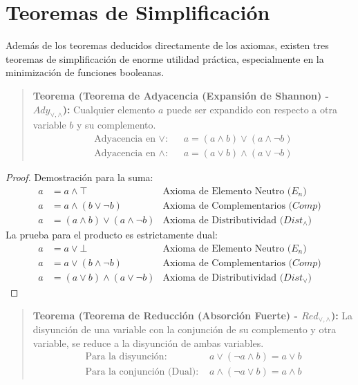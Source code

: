 \section{Teoremas de Simplificación}

Además de los teoremas deducidos directamente de los axiomas, existen tres teoremas de simplificación de enorme utilidad práctica, especialmente en la minimización de funciones booleanas.

\begin{quote}\textbf{Teorema (Teorema de Adyacencia (Expansión de Shannon) - $Ady_{\vee, \wedge}$):}\label{adyacencia}
Cualquier elemento $a$ puede ser expandido con respecto a otra variable $b$ y su complemento.
\begin{align*}
    \text{Adyacencia en $\vee:$ } & a = (a \wedge b) \vee (a \wedge \neg b) \\
    \text{Adyacencia en $\wedge:$ } & a = (a \vee b) \wedge (a \vee \neg b)
\end{align*}
\end{quote}

\begin{proof}
Demostración para la suma:
\begin{align*}
    a &= a \wedge \top & \text{Axioma de Elemento Neutro ($E_n$)} \\
    a &= a \wedge (b \vee \neg b) & \text{Axioma de Complementarios ($Comp$)} \\
    a &= (a \wedge b) \vee (a \wedge \neg b) & \text{Axioma de Distributividad ($Dist_{\wedge}$)}
\end{align*}
La prueba para el producto es estrictamente dual:
\begin{align*}
    a &= a \vee \bot & \text{Axioma de Elemento Neutro ($E_n$)} \\
    a &= a \vee (b \wedge \neg b) & \text{Axioma de Complementarios ($Comp$)} \\
    a &= (a \vee b) \wedge (a \vee \neg b) & \text{Axioma de Distributividad ($Dist_{\vee}$)}
\end{align*}
\end{proof}

\begin{quote}\textbf{Teorema (Teorema de Reducción (Absorción Fuerte) - $Red_{\vee, \wedge}$):}\label{reduccion}
La disyunción de una variable con la conjunción de su complemento y otra variable, se reduce a la disyunción de ambas variables.
\begin{align*}
    \text{Para la disyunción: } & a \vee (\neg a \wedge b) = a \vee b \\
    \text{Para la conjunción (Dual): } & a \wedge (\neg a \vee b) = a \wedge b
\end{align*}
\end{quote}

